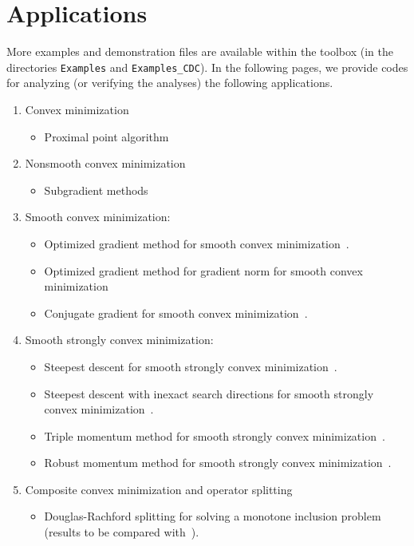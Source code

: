 \documentclass[11pt,a4paper]{article}
\begin{document}
\section{Applications}		%
More examples and demonstration files are available within the toolbox (in the directories \verb?Examples? and \verb?Examples_CDC?). In the following pages, we provide codes for analyzing (or verifying the analyses) the following applications. 
\begin{enumerate}
	\item Convex minimization
	\begin{itemize}
		\item Proximal point algorithm
	\end{itemize}
	\item Nonsmooth convex minimization
	\begin{itemize}
		\item Subgradient methods
	\end{itemize}
	\item Smooth convex minimization:
	\begin{itemize}
		\item Optimized gradient method for smooth convex minimization~\cite{kim2014optimized}.
		\item Optimized gradient method for gradient norm for smooth convex minimization~\cite{kim2018optimizing}
		\item Conjugate gradient for smooth convex minimization~\cite{drori2018efficient}.
	\end{itemize}
	\item Smooth strongly convex minimization:
	\begin{itemize}
		\item Steepest descent for smooth strongly convex minimization~\cite{deKlerkELS2016}.
		\item Steepest descent with inexact search directions for smooth strongly convex minimization~\cite{deKlerkELS2016}.
		\item Triple momentum method for smooth strongly convex minimization~\cite{van2018fastest}.
		\item Robust momentum method for smooth strongly convex minimization~\cite{cyrus2018robust}.
	\end{itemize}
	\item Composite convex minimization and operator splitting
	\begin{itemize}
		\item Douglas-Rachford splitting for solving a monotone inclusion problem (results to be compared with~\cite{ryu2018operator}).

\end{itemize}
\end{enumerate}
\end{document}
